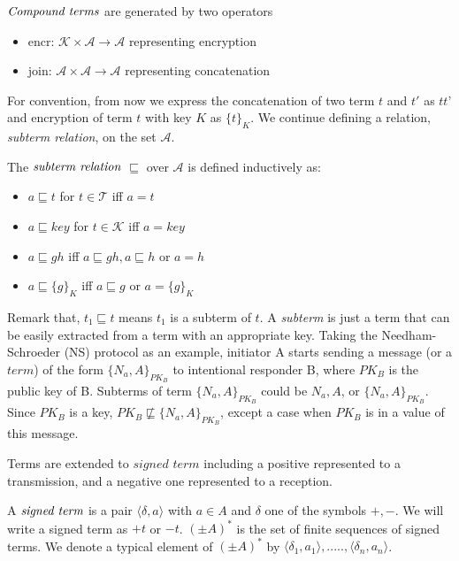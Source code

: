 \begin{Definition} $\emph{Compound terms}$ are generated by two operators
\begin{itemize}
	\item encr: $\mathcal{K} \times \mathcal{A} \rightarrow \mathcal{A}$ representing encryption
	\item join: $\mathcal{A} \times \mathcal{A} \rightarrow \mathcal{A}$ representing concatenation
\end{itemize}
\end{Definition}

For convention, from now we express the concatenation of two term $t$ and $t'$ as $\textit{tt'}$ and encryption of term $t$ with key $K$ as $\{t\}_K$. We continue defining a relation, \textit{subterm relation}, on the set $\mathcal{A}$. 

\begin{Definition} The $\emph{subterm relation}$ $\sqsubseteq$ over $\mathcal{A}$ is defined inductively as: 
	\begin{itemize}
		\item $a \sqsubseteq t $ for $t \in \mathcal{T}$   iff $a = t $
		\item $a \sqsubseteq key $ for $t \in \mathcal{K}$   iff $a = key $
		\item $a \sqsubseteq gh $ iff $a \sqsubseteq gh, a \sqsubseteq h $ or $ a= h $
		\item $a \sqsubseteq \{g\}_K $ iff $a \sqsubseteq g $ or $a = \{g\}_K$
	\end{itemize} 
\end{Definition}

Remark that, $t_1\sqsubseteq t$ means $t_1$ is a subterm of $t$. A \textit{subterm} is just a term that can be easily extracted from a term with an appropriate key. Taking the Needham-Schroeder \cite{Needham:1978:UEA:359657.359659}(NS) protocol as an example, initiator A starts sending a message (or a $term$) of the form $\{N_a,A\}_{PK_B}$ to intentional responder B, where $PK_B$ is the public key of B. Subterms of term $\{N_a,A\}_{PK_B}$ could be $N_a, A$, or $\{N_a,A\}_{PK_B}$. Since $PK_B$ is a key, $PK_B \not\sqsubseteq \{N_a,A\}_{PK_B}$, except a case when $PK_B$ is in a value of this message. 

Terms are extended to $\textit{signed term}$ including a positive represented to a transmission, and a negative one represented to a reception. 

\begin{Definition} A $\emph{signed term}$ is a pair $\langle\delta,a\rangle$ with $a \in A$ and $\delta$ one of the symbols $+,-$. We will write a signed term as $+t$ or $-t$. $(\pm A)^*$ is the set of finite sequences of signed terms. We denote a typical element of $(\pm A)^*$ by $\langle \delta_1,a_1\rangle,.....,\langle\delta_n,a_n\rangle$.
\end{Definition}

